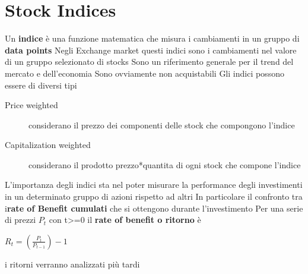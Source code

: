 \documentclass[a4paper,11pt]{report}
\begin{document}
{\section{Stock Indices} \label{Indici:1}
Un \textbf{indice} è una funzione matematica che misura i cambiamenti in un gruppo di \textbf{data points} \newline
Negli Exchange market questi indici sono i cambiamenti nel valore di un gruppo selezionato di stocks \newline
Sono un riferimento generale per il trend del mercato e dell'economia \newline
Sono ovviamente non acquistabili \newline
Gli indici possono essere di diversi tipi
\begin{description}
	\item[Price weighted] considerano il prezzo dei componenti delle stock che compongono l'indice
	\item[Capitalization weighted] considerano il prodotto prezzo*quantita di ogni stock che compone l'indice
\end{description}
L'importanza degli indici sta nel poter misurare la performance degli investimenti in un determinato gruppo di azioni rispetto ad altri \newline
In particolare il confronto tra i\textbf{rate of Benefit cumulati} che si ottengono durante l'investimento \newline
Per una serie di prezzi $P_t$ con t>=0 il \textbf{rate of benefit o ritorno} è \newline
\begin{center}
	$R_t=({\frac{P_t}{P_{t-1}}})-1$
\end{center}
i ritorni verranno analizzati più tardi %
\newpage
}
\end{document}
